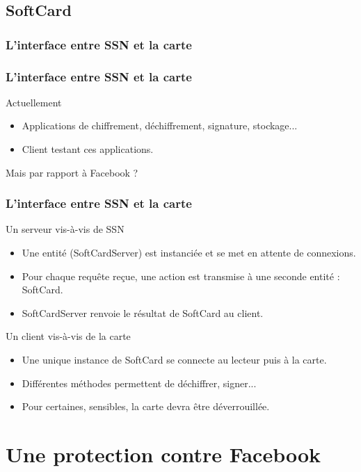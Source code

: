 \documentclass{beamer}
\begin{document}
\subsection{SoftCard}
\begin{frame}
\frametitle{L'interface entre SSN et la carte}
    \frametitle{L'interface entre SSN et la carte}
    \begin{block}{Actuellement}
        \begin{itemize}
            \item Applications de chiffrement, déchiffrement, signature, stockage...
            \item Client testant ces applications.
        \end{itemize}
    \end{block}

    Mais par rapport à Facebook ?
\end{frame}

\begin{frame}
    \frametitle{L'interface entre SSN et la carte}
    \begin{block}{Un serveur vis-à-vis de SSN}
        \begin{itemize}
            \item Une entité (SoftCardServer) est instanciée et se met en
                attente de connexions.
            \item Pour chaque requête reçue, une action est transmise
                à une seconde entité : SoftCard.
            \item SoftCardServer renvoie le résultat de SoftCard au client.
        \end{itemize}
    \end{block}
    \begin{block}{Un client vis-à-vis de la carte}
        \begin{itemize}
            \item Une unique instance de SoftCard se connecte au lecteur puis à
                la carte.
            \item Différentes méthodes permettent de déchiffrer, signer...
            \item Pour certaines, sensibles, la carte devra être déverrouillée.
        \end{itemize}
    \end{block}
\end{frame}

\section{Une protection contre Facebook}
\end{document}

